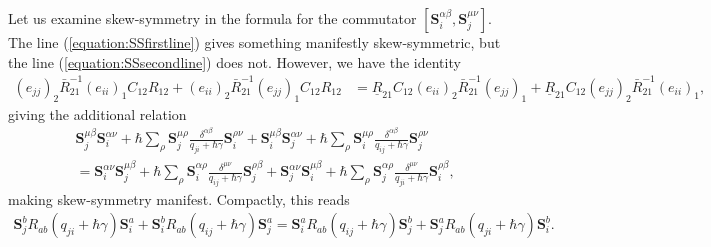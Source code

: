 \documentclass[11pt]{report}
\theoremstyle{definition}
\theoremstyle{remark}
\theoremstyle{remark}
\begin{document}
Let us examine skew-symmetry in the formula for the commutator $[\mathbf{S}_i^{\alpha\beta},\mathbf{S}_j^{\mu\nu}]$. The line (\ref{equation:SSfirstline}) gives something manifestly skew-symmetric, but the line (\ref{equation:SSsecondline}) does not. However, we have the identity
\begin{align*}
(e_{jj})_2 \bar R_{21}^{-1} (e_{ii})_1 C_{12} R_{12} + (e_{ii})_2 \bar R_{21}^{-1} (e_{jj})_1 C_{12} R_{12}
&= \underline{R}_{21} C_{12} (e_{ii})_2 \bar R_{21}^{-1} (e_{jj})_1 + \underline{R}_{21} C_{12} (e_{jj})_2 \bar R_{21}^{-1} (e_{ii})_1,
\end{align*}
giving the additional relation
\begin{align*}
&\mathbf{S}_j^{\mu\beta} \mathbf{S}_i^{\alpha\nu} + \hbar \sum_\rho \mathbf{S}_j^{\mu\rho} \frac{\delta^{\alpha\beta}}{q_{ji}+\hbar\gamma} \mathbf{S}_i^{\rho\nu} + \mathbf{S}_i^{\mu\beta} \mathbf{S}_j^{\alpha\nu} + \hbar \sum_\rho \mathbf{S}_i^{\mu\rho} \frac{\delta^{\alpha\beta}}{q_{ij}+\hbar\gamma} \mathbf{S}_j^{\rho\nu} \\
&= \mathbf{S}_i^{\alpha\nu} \mathbf{S}_j^{\mu\beta} + \hbar \sum_\rho \mathbf{S}_i^{\alpha\rho} \frac{\delta^{\mu\nu}}{q_{ij}+\hbar\gamma} \mathbf{S}_j^{\rho\beta} + \mathbf{S}_j^{\alpha\nu} \mathbf{S}_i^{\mu\beta} + \hbar \sum_\rho \mathbf{S}_j^{\alpha\rho} \frac{\delta^{\mu\nu}}{q_{ji}+\hbar\gamma} \mathbf{S}_i^{\rho\beta},
\end{align*}
making skew-symmetry manifest. Compactly, this reads
\begin{align*}
\mathbf{S}_j^b R_{ab}(q_{ji}+\hbar\gamma) \mathbf{S}_i^a + \mathbf{S}_i^b R_{ab}(q_{ij}+\hbar\gamma) \mathbf{S}_j^a = \mathbf{S}_i^a R_{ab}(q_{ij}+\hbar\gamma) \mathbf{S}_j^b + \mathbf{S}_j^a R_{ab}(q_{ji}+\hbar\gamma) \mathbf{S}_i^b.
\end{align*}

\end{document}
